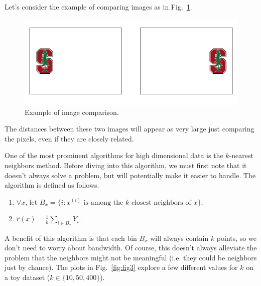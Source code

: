 \begin{example}
Let's consider the example of comparing images as in Fig.~\ref{fig:fig2}.
\begin{figure}
	\centering
    \includegraphics[scale = .4]{figure/Lecture04/image_flip.png}
	\caption{Example of image comparison.} \label{fig:fig2}
\end{figure}
\end{example}
The distances between these two images will appear as very large just comparing the pixels, even if they are closely related.


\noindent One of the most prominent algorithms for high dimensional data is the $k$-nearest neighbors method. Before diving into this algorithm, we must first note that it doesn't always solve a problem, but will potentially make it easier to handle. The algorithm is defined as follows.
\begin{enumerate}
    \item $\forall x$, let $B_x = \{i : x^{(i)} \text{ is among the } k \text{ closest neighbors of } x\}$;
    \item $\hat{r}(x) = \frac{1}{k} \sum_{i \in B_x} Y_i$.
\end{enumerate}
A benefit of this algorithm is that each bin $B_x$ will always contain $k$ points, so we don't need to worry about bandwidth. Of course, this doesn't always alleviate the problem that the neighbors might not be meaningful (i.e. they could be neighbors just by chance). The plots in Fig.~\ref{fig:fig3} explore a few different values for $k$ on a toy dataset ($k \in \{10, 50, 400\}$).

